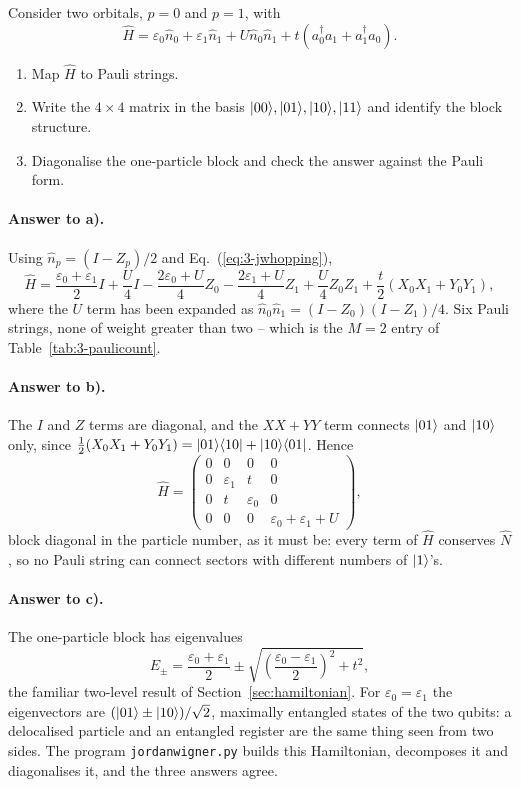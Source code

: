 Consider two orbitals, $p=0$ and $p=1$, with
\[
  \hat{H} = \varepsilon_0\hat{n}_0 + \varepsilon_1\hat{n}_1
    + U\hat{n}_0\hat{n}_1
    + t\left(a_0^{\dagger}a_1 + a_1^{\dagger}a_0\right).
\]

\begin{enumerate}
  \item[a)] Map $\hat{H}$ to Pauli strings.
  \item[b)] Write the $4\times4$ matrix in the basis
  $\vert 00 \rangle,\vert 01 \rangle,\vert 10 \rangle,\vert 11 \rangle$ and identify the block structure.
  \item[c)] Diagonalise the one-particle block and check the answer against
  the Pauli form.
\end{enumerate}

\paragraph{Answer to a).}
Using $\hat{n}_p=(I-Z_p)/2$ and Eq.~(\ref{eq:3-jwhopping}),
\[
  \hat{H}
   = \frac{\varepsilon_0+\varepsilon_1}{2}I
     + \frac{U}{4}I
     - \frac{2\varepsilon_0+U}{4}Z_0
     - \frac{2\varepsilon_1+U}{4}Z_1
     + \frac{U}{4}Z_0Z_1
     + \frac{t}{2}\left(X_0X_1+Y_0Y_1\right),
\]
where the $U$ term has been expanded as
$\hat{n}_0\hat{n}_1=(I-Z_0)(I-Z_1)/4$.  Six Pauli strings, none of weight
greater than two -- which is the $M=2$ entry of
Table~\ref{tab:3-paulicount}.

\paragraph{Answer to b).}
The $I$ and $Z$ terms are diagonal, and the $XX+YY$ term connects $\vert 01 \rangle$
and $\vert 10 \rangle$ only, since
$\tfrac12(X_0X_1+Y_0Y_1)=\vert 01 \rangle\langle 10 \vert+\vert 10 \rangle\langle 01 \vert$.  Hence
\[
  \hat{H} = \begin{pmatrix}
    0 & 0 & 0 & 0\\
    0 & \varepsilon_1 & t & 0\\
    0 & t & \varepsilon_0 & 0\\
    0 & 0 & 0 & \varepsilon_0+\varepsilon_1+U
  \end{pmatrix},
\]
block diagonal in the particle number, as it must be: every term of
$\hat{H}$ conserves $\hat{N}$, so no Pauli string can connect sectors with
different numbers of $\vert 1 \rangle$'s.

\paragraph{Answer to c).}
The one-particle block has eigenvalues
\[
  E_{\pm} = \frac{\varepsilon_0+\varepsilon_1}{2}
    \pm\sqrt{\left(\frac{\varepsilon_0-\varepsilon_1}{2}\right)^2+t^2} ,
\]
the familiar two-level result of Section~\ref{sec:hamiltonian}.  For
$\varepsilon_0=\varepsilon_1$ the eigenvectors are
$(\vert 01 \rangle\pm\vert 10 \rangle)/\sqrt2$, maximally entangled states of the two
qubits: a delocalised particle and an entangled register are the same thing
seen from two sides.  The program \texttt{jordanwigner.py} builds this
Hamiltonian, decomposes it and diagonalises it, and the three answers agree.
